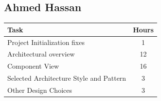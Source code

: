 \subsection{Ahmed Hassan}

{\centering
\begin{tabular}{@{}p{8cm}c@{}}
	\toprule
	\textbf{Task} & \textbf{Hours} \\
\midrule
Project Initialization fixes & 1 \\
Architectural overview & 12 \\
Component View & 16 \\
Selected Architecture Style and Pattern & 3 \\
Other Design Choices & 3 \\
\bottomrule
\end{tabular}\par}
